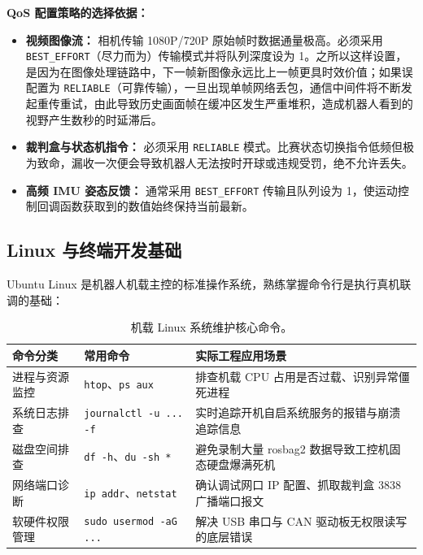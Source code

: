 \noindent\textbf{QoS 配置策略的选择依据：}

\begin{itemize}[leftmargin=*]
    \item \textbf{视频图像流：} 相机传输 1080P/720P 原始帧时数据通量极高。必须采用 \texttt{BEST\_EFFORT}（尽力而为）传输模式并将队列深度设为 1。之所以这样设置，是因为在图像处理链路中，下一帧新图像永远比上一帧更具时效价值；如果误配置为 \texttt{RELIABLE}（可靠传输），一旦出现单帧网络丢包，通信中间件将不断发起重传重试，由此导致历史画面帧在缓冲区发生严重堆积，造成机器人看到的视野产生数秒的时延滞后。
    \item \textbf{裁判盒与状态机指令：} 必须采用 \texttt{RELIABLE} 模式。比赛状态切换指令低频但极为致命，漏收一次便会导致机器人无法按时开球或违规受罚，绝不允许丢失。
    \item \textbf{高频 IMU 姿态反馈：} 通常采用 \texttt{BEST\_EFFORT} 传输且队列设为 1，使运动控制回调函数获取到的数值始终保持当前最新。
\end{itemize}

\subsection{Linux 与终端开发基础}

Ubuntu Linux 是机器人机载主控的标准操作系统，熟练掌握命令行是执行真机联调的基础：

\begin{table}[H]
\centering
\small
\begin{tabularx}{\textwidth}{p{3.2cm} p{4.2cm} X}
\toprule
\textbf{命令分类} & \textbf{常用命令} & \textbf{实际工程应用场景} \\
\midrule
进程与资源监控 & \texttt{htop}、\texttt{ps aux} & 排查机载 CPU 占用是否过载、识别异常僵死进程 \\
\addlinespace
系统日志排查 & \texttt{journalctl -u ... -f} & 实时追踪开机自启系统服务的报错与崩溃追踪信息 \\
\addlinespace
磁盘空间排查 & \texttt{df -h}、\texttt{du -sh *} & 避免录制大量 rosbag2 数据导致工控机固态硬盘爆满死机 \\
\addlinespace
网络端口诊断 & \texttt{ip addr}、\texttt{netstat} & 确认调试网口 IP 配置、抓取裁判盒 3838 广播端口报文 \\
\addlinespace
软硬件权限管理 & \texttt{sudo usermod -aG ...} & 解决 USB 串口与 CAN 驱动板无权限读写的底层错误 \\
\bottomrule
\end{tabularx}
\caption{机载 Linux 系统维护核心命令。}
\end{table}

